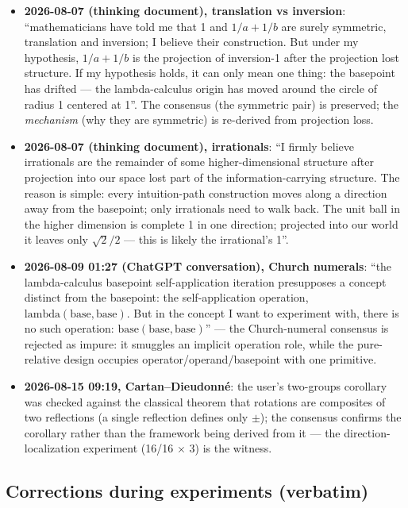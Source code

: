 \documentclass[sigplan,10pt,anonymous,review]{acmart}
\begin{document}
\begin{itemize}
\item \textbf{2026-08-07 (thinking document), translation vs inversion}:
``mathematicians have told me that 1 and $1/a+1/b$ are surely symmetric,
translation and inversion; I believe their construction. But under my
hypothesis, $1/a+1/b$ is the projection of inversion-1 after the
projection lost structure. If my hypothesis holds, it can only mean one
thing: the basepoint has drifted --- the lambda-calculus origin has moved
around the circle of radius 1 centered at 1''. The consensus (the
symmetric pair) is preserved; the \emph{mechanism} (why they are
symmetric) is re-derived from projection loss.
\item \textbf{2026-08-07 (thinking document), irrationals}: ``I firmly
believe irrationals are the remainder of some higher-dimensional structure
after projection into our space lost part of the information-carrying
structure. The reason is simple: every intuition-path construction moves
along a direction away from the basepoint; only irrationals need to walk
back. The unit ball in the higher dimension is complete 1 in one
direction; projected into our world it leaves only $\sqrt2/2$ --- this is
likely the irrational's 1''.
\item \textbf{2026-08-09 01:27 (ChatGPT conversation), Church numerals}:
``the lambda-calculus basepoint self-application iteration presupposes a
concept distinct from the basepoint: the self-application operation,
$\mathrm{lambda}(\mathrm{base},\mathrm{base})$. But in the concept I want
to experiment with, there is no such operation: $\mathrm{base}(\mathrm
{base},\mathrm{base})$'' --- the Church-numeral consensus is rejected as
impure: it smuggles an implicit operation role, while the pure-relative
design occupies operator/operand/basepoint with one primitive.
\item \textbf{2026-08-15 09:19, Cartan--Dieudonn\'e}: the user's
two-groups corollary was checked against the classical theorem that
rotations are composites of two reflections (a single reflection defines
only $\pm$); the consensus confirms the corollary rather than the
framework being derived from it --- the direction-localization experiment
(16/16 $\times$ 3) is the witness.
\end{itemize}

\subsection{Corrections during experiments (verbatim)}
\end{document}

